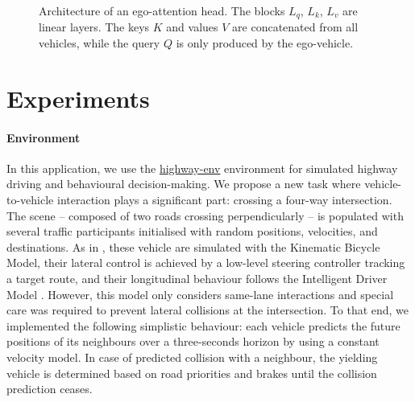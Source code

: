 \documentclass{article}
\begin{document}
\begin{figure}[tp]
	\caption{Architecture of an ego-attention head.
		The blocks $L_{q}$, $L_{k}$, $L_{v}$ are linear layers. The keys $K$ and values $V$ are concatenated from all vehicles, while the query $Q$ is only produced by the ego-vehicle.}
	\label{fig:ego-attention}
\end{figure}


\section{Experiments}
\paragraph{Environment}

In this application, we use the \href{https://github.com/eleurent/highway-env}{highway-env} environment \citep{highway-env} for simulated highway driving and behavioural decision-making. We propose a new task where vehicle-to-vehicle interaction plays a significant part: crossing a four-way intersection.
The scene -- composed of two roads crossing perpendicularly -- is populated with several traffic participants initialised with random positions, velocities, and destinations. As in \citep{highway-env}, these vehicle are simulated with the Kinematic Bicycle Model, their lateral control is achieved by a low-level steering controller tracking a target route, and their longitudinal behaviour follows the Intelligent Driver Model \citep{Treiber2000}. However, this model only considers same-lane interactions and special care was required to prevent lateral collisions at the intersection. To that end, we implemented the following simplistic behaviour: each vehicle predicts the future positions of its neighbours over a three-seconds horizon by using a constant velocity model. In case of predicted collision with a neighbour, the yielding vehicle is determined based on road priorities and brakes until the collision prediction ceases. 
\end{document}
